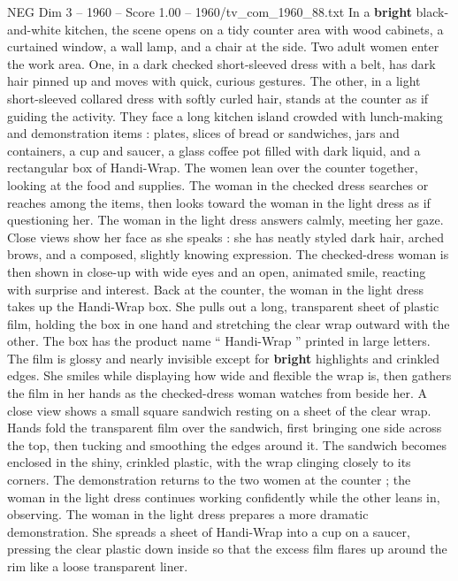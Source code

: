 \begin{textsample}{NEG Dim 3 – 1960 – Score 1.00 – 1960/tv\_com\_1960\_88.txt}  \label{ex:f3_neg_080}
In a \textbf{bright} black-and-white kitchen, the scene opens on a tidy counter area with wood cabinets, a curtained window, a wall lamp, and a chair at the side.
Two adult women enter the work area.
One, in a dark checked short-sleeved dress with a belt, has dark hair pinned up and moves with quick, curious gestures.
The other, in a light short-sleeved collared dress with softly curled hair, stands at the counter as if guiding the activity.
They face a long kitchen island crowded with lunch-making and demonstration items : plates, slices of bread or sandwiches, jars and containers, a cup and saucer, a glass coffee pot filled with dark liquid, and a rectangular box of Handi-Wrap.
The women lean over the counter together, looking at the food and supplies.
The woman in the checked dress searches or reaches among the items, then looks toward the woman in the light dress as if questioning her.
The woman in the light dress answers calmly, meeting her gaze.
Close views show her face as she speaks : she has neatly styled dark hair, arched brows, and a composed, slightly knowing expression.
The checked-dress woman is then shown in close-up with wide eyes and an open, animated smile, reacting with surprise and interest.
Back at the counter, the woman in the light dress takes up the Handi-Wrap box.
She pulls out a long, transparent sheet of plastic film, holding the box in one hand and stretching the clear wrap outward with the other.
The box has the product name “ Handi-Wrap ” printed in large letters.
The film is glossy and nearly invisible except for \textbf{bright} highlights and crinkled edges.
She smiles while displaying how wide and flexible the wrap is, then gathers the film in her hands as the checked-dress woman watches from beside her.
A close view shows a small square sandwich resting on a sheet of the clear wrap.
Hands fold the transparent film over the sandwich, first bringing one side across the top, then tucking and smoothing the edges around it.
The sandwich becomes enclosed in the shiny, crinkled plastic, with the wrap clinging closely to its corners.
The demonstration returns to the two women at the counter ; the woman in the light dress continues working confidently while the other leans in, observing.
The woman in the light dress prepares a more dramatic demonstration.
She spreads a sheet of Handi-Wrap into a cup on a saucer, pressing the clear plastic down inside so that the excess film flares up around the rim like a loose transparent liner.

\end{textsample}
